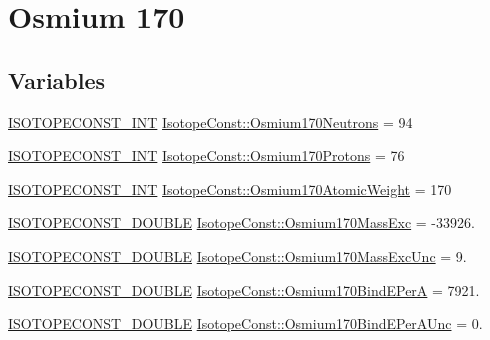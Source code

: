 \hypertarget{group___isotope_const-_osmium-_os170}{}\section{Osmium 170}
\label{group___isotope_const-_osmium-_os170}
\subsection*{Variables}
\begin{DoxyCompactItemize}
\item 
\mbox{\hyperlink{group___isotope_const-_macros_ga5f18360b3e99483a35c32d789e62621c}{I\+S\+O\+T\+O\+P\+E\+C\+O\+N\+S\+T\+\_\+\+I\+NT}} \mbox{\hyperlink{group___isotope_const-_osmium-_os170_ga8ea37541bcbe34c15651bb26935f1b55}{Isotope\+Const\+::\+Osmium170\+Neutrons}} = 94
\item 
\mbox{\hyperlink{group___isotope_const-_macros_ga5f18360b3e99483a35c32d789e62621c}{I\+S\+O\+T\+O\+P\+E\+C\+O\+N\+S\+T\+\_\+\+I\+NT}} \mbox{\hyperlink{group___isotope_const-_osmium-_os170_ga8f9f10af89855d2254570f7b58253131}{Isotope\+Const\+::\+Osmium170\+Protons}} = 76
\item 
\mbox{\hyperlink{group___isotope_const-_macros_ga5f18360b3e99483a35c32d789e62621c}{I\+S\+O\+T\+O\+P\+E\+C\+O\+N\+S\+T\+\_\+\+I\+NT}} \mbox{\hyperlink{group___isotope_const-_osmium-_os170_ga871d6579ee892a53a9f790ef6c6281ce}{Isotope\+Const\+::\+Osmium170\+Atomic\+Weight}} = 170
\item 
\mbox{\hyperlink{group___isotope_const-_macros_ga8f45a7272ce02c0b4c65c44636ed719a}{I\+S\+O\+T\+O\+P\+E\+C\+O\+N\+S\+T\+\_\+\+D\+O\+U\+B\+LE}} \mbox{\hyperlink{group___isotope_const-_osmium-_os170_ga864298d2d3f6c1d5372be017e88ae4d8}{Isotope\+Const\+::\+Osmium170\+Mass\+Exc}} = -\/33926.
\item 
\mbox{\hyperlink{group___isotope_const-_macros_ga8f45a7272ce02c0b4c65c44636ed719a}{I\+S\+O\+T\+O\+P\+E\+C\+O\+N\+S\+T\+\_\+\+D\+O\+U\+B\+LE}} \mbox{\hyperlink{group___isotope_const-_osmium-_os170_ga700744199f2bf60833b2e29957f86d54}{Isotope\+Const\+::\+Osmium170\+Mass\+Exc\+Unc}} = 9.
\item 
\mbox{\hyperlink{group___isotope_const-_macros_ga8f45a7272ce02c0b4c65c44636ed719a}{I\+S\+O\+T\+O\+P\+E\+C\+O\+N\+S\+T\+\_\+\+D\+O\+U\+B\+LE}} \mbox{\hyperlink{group___isotope_const-_osmium-_os170_ga3de6e070df17b184d012d9740da577e1}{Isotope\+Const\+::\+Osmium170\+Bind\+E\+PerA}} = 7921.
\item 
\mbox{\hyperlink{group___isotope_const-_macros_ga8f45a7272ce02c0b4c65c44636ed719a}{I\+S\+O\+T\+O\+P\+E\+C\+O\+N\+S\+T\+\_\+\+D\+O\+U\+B\+LE}} \mbox{\hyperlink{group___isotope_const-_osmium-_os170_ga194c380732e0d9d03ac9dc2094c68761}{Isotope\+Const\+::\+Osmium170\+Bind\+E\+Per\+A\+Unc}} = 0.

\end{DoxyCompactItemize}
